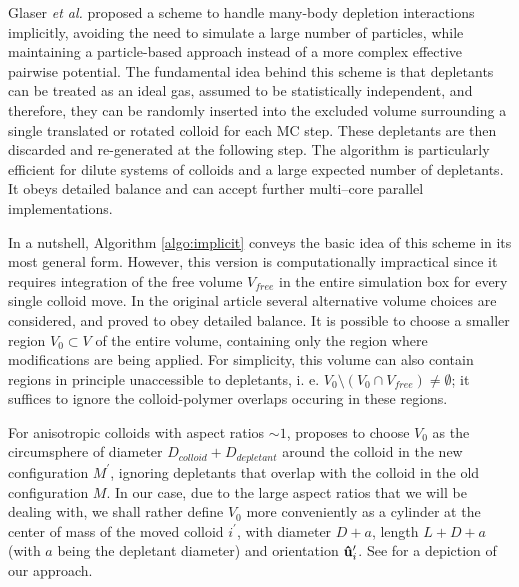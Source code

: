 Glaser {\em et al.} \cite{glaser2015parallel} proposed a scheme to handle many-body depletion interactions implicitly, avoiding the need to simulate a large number of particles, while maintaining a particle-based approach instead of a more complex effective pairwise potential. The fundamental idea behind this scheme is that depletants can be treated as an ideal gas, assumed to be statistically independent, and therefore, they can be randomly inserted into the excluded volume surrounding a single translated or rotated colloid for each MC step. These depletants are then discarded and re-generated at the following step. The algorithm is particularly efficient for dilute systems of colloids and a large expected number of depletants. It obeys detailed balance and can accept further multi--core parallel implementations.

In a nutshell, Algorithm \ref{algo:implicit} conveys the basic idea of this scheme in its most general form. However, this version is computationally impractical since it requires integration of the free volume $V_{free}$ in the entire simulation box for every single colloid move. In the original article \cite{glaser2015parallel} several alternative volume choices are considered, and proved to obey detailed balance. It is possible to choose a smaller region $V_0 \subset V$ of the entire volume, containing only the region where modifications are being applied. For simplicity, this volume can also contain regions in principle unaccessible to depletants, i. e. $V_0 \setminus (V_0 \cap V_{free}) \neq \emptyset$; it suffices to ignore the colloid-polymer overlaps occuring in these regions.

For anisotropic colloids with aspect ratios $\sim 1$, \cite{glaser2015parallel} proposes to choose $V_0$ as the circumsphere of diameter $D_{colloid} + D_{depletant}$ around the colloid in the new configuration $M^\prime$, ignoring depletants that overlap with the colloid in the old configuration $M$. In our case, due to the large aspect ratios that we will be dealing with, we shall rather define $V_0$ more conveniently as a cylinder at the center of mass of the moved colloid $i^\prime$, with diameter $D + a$, length $L + D + a$ (with $a$ being the depletant diameter) and orientation ${\bf \hat{u}}_i^\prime$. See  for a depiction of our approach.

